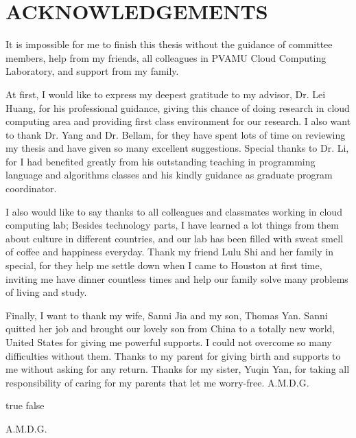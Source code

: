 %
%
%


\chapter*{ACKNOWLEDGEMENTS}

It is impossible for me to finish this thesis without the guidance of committee members, help from my friends, all colleagues in PVAMU Cloud Computing Laboratory, and support from my family.

At first, I would like to express my deepest gratitude to my advisor, Dr. Lei Huang, for his professional guidance, giving this chance of doing research in cloud computing area and providing first class environment for our research. I also want to thank Dr. Yang and Dr. Bellam, for they have spent lots of time on reviewing my thesis and have given so many excellent suggestions. Special thanks to Dr. Li, for I had benefited greatly from his outstanding teaching in programming language and algorithms classes and his kindly guidance as graduate program coordinator.

I also would like to say thanks to all colleagues and classmates working in cloud computing lab; Besides technology parts, I have learned a lot things from them about culture in different countries, and our lab has been filled with sweat smell of coffee and happiness everyday. Thank my friend Lulu Shi and her family in special, for they help me settle down when I came to Houston at first time, inviting me have dinner countless times and help our family solve many problems of living and study.

Finally, I want to thank my wife, Sanni Jia and my son, Thomas Yan. Sanni quitted her job and brought our lovely son from China to a totally new world, United States for giving me powerful supports. I could not overcome so many difficulties without them. Thanks to my parent for giving birth and supports to me without asking for any return. Thanks for my sister, Yuqin Yan, for taking all responsibility of caring for my parents that let me worry-free. A.M.D.G.  


\pagebreak{}

\ifx true false
\vspace*{\fill}
\begin{center}
A.M.D.G.
\end{center}
\vspace*{\fill}
\pagebreak{}
\fi
